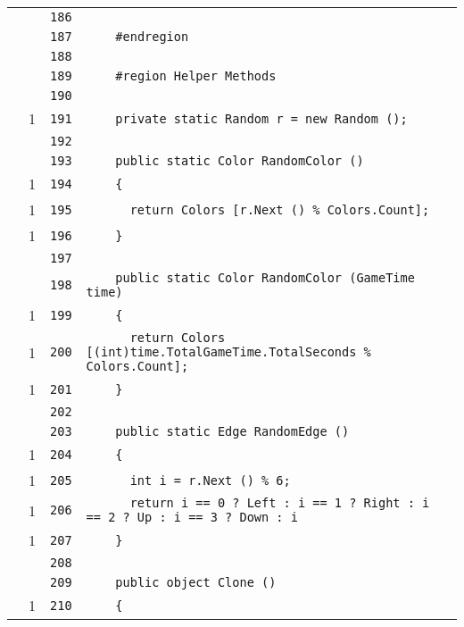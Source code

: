 \documentclass[a4paper,10pt]{article}
\begin{document}
\begin{longtable}[l]{lrrl}
\cellcolor{gray} &  & \verb~186~ & \verb~~\\
\cellcolor{gray} &  & \verb~187~ & \verb~    #endregion~\\
\cellcolor{gray} &  & \verb~188~ & \verb~~\\
\cellcolor{gray} &  & \verb~189~ & \verb~    #region Helper Methods~\\
\cellcolor{gray} &  & \verb~190~ & \verb~~\\
\cellcolor{green} & 1 & \verb~191~ & \verb~    private static Random r = new Random ();~\\
\cellcolor{gray} &  & \verb~192~ & \verb~~\\
\cellcolor{gray} &  & \verb~193~ & \verb~    public static Color RandomColor ()~\\
\cellcolor{green} & 1 & \verb~194~ & \verb~    {~\\
\cellcolor{green} & 1 & \verb~195~ & \verb~      return Colors [r.Next () % Colors.Count];~\\
\cellcolor{green} & 1 & \verb~196~ & \verb~    }~\\
\cellcolor{gray} &  & \verb~197~ & \verb~~\\
\cellcolor{gray} &  & \verb~198~ & \verb~    public static Color RandomColor (GameTime time)~\\
\cellcolor{green} & 1 & \verb~199~ & \verb~    {~\\
\cellcolor{green} & 1 & \verb~200~ & \verb~      return Colors [(int)time.TotalGameTime.TotalSeconds % Colors.Count];~\\
\cellcolor{green} & 1 & \verb~201~ & \verb~    }~\\
\cellcolor{gray} &  & \verb~202~ & \verb~~\\
\cellcolor{gray} &  & \verb~203~ & \verb~    public static Edge RandomEdge ()~\\
\cellcolor{green} & 1 & \verb~204~ & \verb~    {~\\
\cellcolor{green} & 1 & \verb~205~ & \verb~      int i = r.Next () % 6;~\\
\cellcolor{green} & 1 & \verb~206~ & \verb~      return i == 0 ? Left : i == 1 ? Right : i == 2 ? Up : i == 3 ? Down : i ~\\
\cellcolor{green} & 1 & \verb~207~ & \verb~    }~\\
\cellcolor{gray} &  & \verb~208~ & \verb~~\\
\cellcolor{gray} &  & \verb~209~ & \verb~    public object Clone ()~\\
\cellcolor{green} & 1 & \verb~210~ & \verb~    {~\\

\end{longtable}
\end{document}
